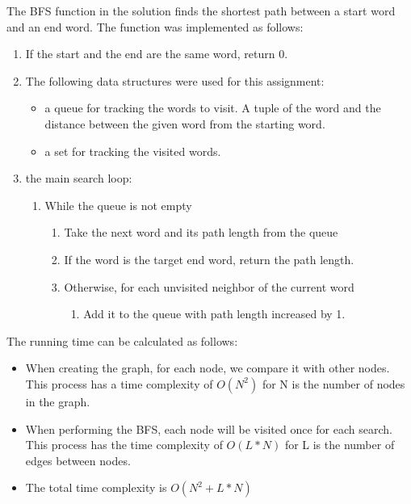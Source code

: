\documentclass{article}
\begin{document}
    The BFS function in the solution finds the shortest path between a start word and an end word. 
    The function was implemented as follows: 
    \begin{enumerate}
        \item If the start and the end are the same word, return 0. 
        \item The following data structures were used for this assignment: 
            \begin{itemize}
                \item a queue for tracking the words to visit. A tuple of the word and the distance between the given word from the starting word. 
                \item a set for tracking the visited words.
            \end{itemize}
        \item the main search loop: 
            \begin{enumerate}
                \item While the queue is not empty
                    \begin{enumerate}
                        \item Take the next word and its path length from the queue
                        \item If the word is the target end word, return the path length. 
                        \item Otherwise, for each unvisited neighbor of the current word
                            \begin{enumerate}
                                \item Add it to the queue with path length increased by 1.  
                            \end{enumerate}
                    \end{enumerate}
            \end{enumerate}
    \end{enumerate}

    The running time can be calculated as follows:
    \begin{itemize}
        \item When creating the graph, for each node, we compare it with other nodes. This process has a time complexity of $O(N^2)$ for N is the number of nodes in the graph.
        \item When performing the BFS, each node will be visited once for each search. This process has the time complexity of $O(L * N)$ for L is the number of edges between nodes.
        \item The total time complexity is $O( N^2 + L*N)$
        
    \end{itemize}
    
\end{document}
